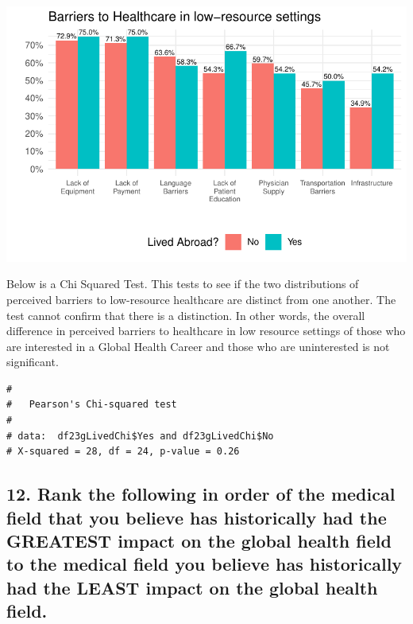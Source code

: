 \documentclass[
  letterpaper,
  DIV=11,
  numbers=noendperiod]{scrartcl}
\begin{document}
\includegraphics{GlobalHealthQuarto11-15_files/figure-pdf/unnamed-chunk-10-1.pdf}

\newpage

Below is a Chi Squared Test. This tests to see if the two distributions
of perceived barriers to low-resource healthcare are distinct from one
another. The test cannot confirm that there is a distinction. In other
words, the overall difference in perceived barriers to healthcare in low
resource settings of those who are interested in a Global Health Career
and those who are uninterested is not significant.

\begin{verbatim}
# 
#   Pearson's Chi-squared test
# 
# data:  df23gLivedChi$Yes and df23gLivedChi$No
# X-squared = 28, df = 24, p-value = 0.26
\end{verbatim}

\newpage

\hypertarget{rank-the-following-in-order-of-the-medical-field-that-you-believe-has-historically-had-the-greatest-impact-on-the-global-health-field-to-the-medical-field-you-believe-has-historically-had-the-least-impact-on-the-global-health-field.}{%
\subsection{12. Rank the following in order of the medical field that
you believe has historically had the GREATEST impact on the global
health field to the medical field you believe has historically had the
LEAST impact on the global health
field.}\label{rank-the-following-in-order-of-the-medical-field-that-you-believe-has-historically-had-the-greatest-impact-on-the-global-health-field-to-the-medical-field-you-believe-has-historically-had-the-least-impact-on-the-global-health-field.}}
\end{document}
